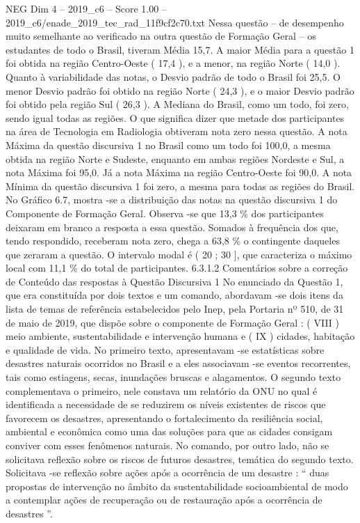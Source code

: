 \begin{textsample}{NEG Dim 4 – 2019\_c6 – Score 1.00 – 2019\_c6/enade\_2019\_tec\_rad\_11f9cf2c70.txt}
Nessa questão – de desempenho muito semelhante ao verificado na outra questão de Formação Geral – os estudantes de todo o Brasil, tiveram Média 15,7.
A maior Média para a questão 1 foi obtida na região Centro-Oeste ( 17,4 ), e a menor, na região Norte ( 14,0 ).
Quanto à variabilidade das notas, o Desvio padrão de todo o Brasil foi 25,5.
O menor Desvio padrão foi obtido na região Norte ( 24,3 ), e o maior Desvio padrão foi obtido pela região Sul ( 26,3 ).
A Mediana do Brasil, como um todo, foi zero, sendo igual todas as regiões.
O que significa dizer que metade dos participantes na área de Tecnologia em Radiologia obtiveram nota zero nessa questão.
A nota Máxima da questão discursiva 1 no Brasil como um todo foi 100,0, a mesma obtida na região Norte e Sudeste, enquanto em ambas regiões Nordeste e Sul, a nota Máxima foi 95,0.
Já a nota Máxima na região Centro-Oeste foi 90,0.
A nota Mínima da questão discursiva 1 foi zero, a mesma para todas as regiões do Brasil.
No Gráfico 6.7, mostra -se a distribuição das notas na questão discursiva 1 do Componente de Formação Geral.
Observa -se que 13,3 \% dos participantes deixaram em branco a resposta a essa questão.
Somados à frequência dos que, tendo respondido, receberam nota zero, chega a 63,8 \% o contingente daqueles que zeraram a questão.
O intervalo modal é ( 20 ; 30 ], que caracteriza o máximo local com 11,1 \% do total de participantes. 6.3.1.2 Comentários sobre a correção de Conteúdo das respostas à Questão Discursiva 1 No enunciado da Questão 1, que era constituída por dois textos e um comando, abordavam -se dois itens da lista de temas de referência estabelecidos pelo Inep, pela Portaria nº 510, de 31 de maio de 2019, que dispõe sobre o componente de Formação Geral : ( VIII ) meio ambiente, sustentabilidade e intervenção humana e ( IX ) cidades, habitação e qualidade de vida.
No primeiro texto, apresentavam -se estatísticas sobre desastres naturais ocorridos no Brasil e a eles associavam -se eventos recorrentes, tais como estiagens, secas, inundações bruscas e alagamentos.
O segundo texto complementava o primeiro, nele constava um relatório da ONU no qual é identificada a necessidade de se reduzirem os níveis existentes de riscos que favorecem os desastres, apresentando o fortalecimento da resiliência social, ambiental e econômica como uma das soluções para que as cidades consigam conviver com esses fenômenos naturais.
No comando, por outro lado, não se solicitava reflexão sobre os riscos de futuros desastres, temática do segundo texto.
Solicitava -se reflexão sobre ações após a ocorrência de um desastre : “ duas propostas de intervenção no âmbito da sustentabilidade socioambiental de modo a contemplar ações de recuperação ou de restauração após a ocorrência de desastres ”.

\end{textsample}
